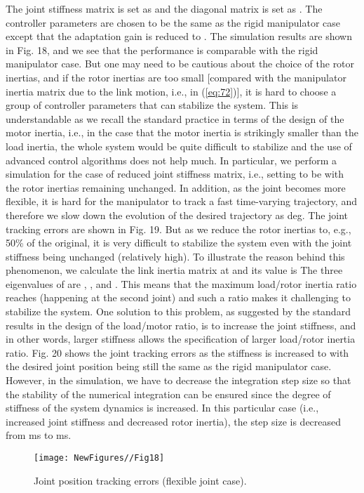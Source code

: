 \documentclass[9pt,technote]{IEEEtran}
\begin{document}
{The joint stiffness matrix  is set as  and the diagonal matrix  is set as  . The controller parameters are chosen to be the same as the rigid manipulator case except that the adaptation gain  is reduced to . The simulation results are shown in Fig. 18, and we see that the performance is comparable with the rigid manipulator case. But one may need to be cautious about the choice of the rotor inertias, and if the rotor inertias are too small [compared with the manipulator inertia matrix due to the link motion, i.e.,  in (\ref{eq:72})], it is hard to choose a group of controller parameters that can stabilize the system. This is understandable as we recall the standard practice in terms of the design of the motor inertia, i.e., in the case that the motor inertia is strikingly smaller than the load inertia, the whole system would be quite difficult to stabilize and the use of advanced control algorithms does not help much. In particular, we perform a simulation for the case of reduced joint stiffness matrix, i.e., setting  to be  with the rotor inertias remaining unchanged. In addition, as the joint becomes more flexible, it is hard for the manipulator to track a fast time-varying trajectory, and therefore we slow down the evolution of the desired trajectory as  deg. The joint tracking errors are shown in Fig. 19. But as we reduce the rotor inertias to, e.g., 50\% of the original, it is very difficult to stabilize the system even with the joint stiffness being unchanged (relatively high). To illustrate the reason behind this phenomenon, we calculate the link inertia matrix  at  and its value is  The three eigenvalues of  are ,  ,  and . This means that the maximum load/rotor inertia ratio reaches  (happening at the second joint) and such a ratio makes it challenging to stabilize the system. One solution to this problem, as suggested by the standard results in the design of the load/motor ratio, is to increase the joint stiffness, and in other words, larger stiffness allows the specification of larger load/rotor inertia ratio. Fig. 20 shows the joint tracking errors as the stiffness is increased to  with the desired joint position being still the same as the rigid manipulator case. However, in the simulation, we have to decrease the integration step size so that the stability of the numerical integration can be ensured since the degree of stiffness of the system dynamics is increased. In this particular case (i.e., increased joint stiffness and decreased rotor inertia), the step size is decreased from  ms to  ms.

\begin{figure}
\centering
\begin{minipage}[t]{1.0\linewidth}
\centering
\texttt{[image: NewFigures//Fig18]}
\caption{Joint position tracking errors (flexible joint case).}\label{fig:side:a}
\end{minipage}\end{figure}

}
\end{document}
